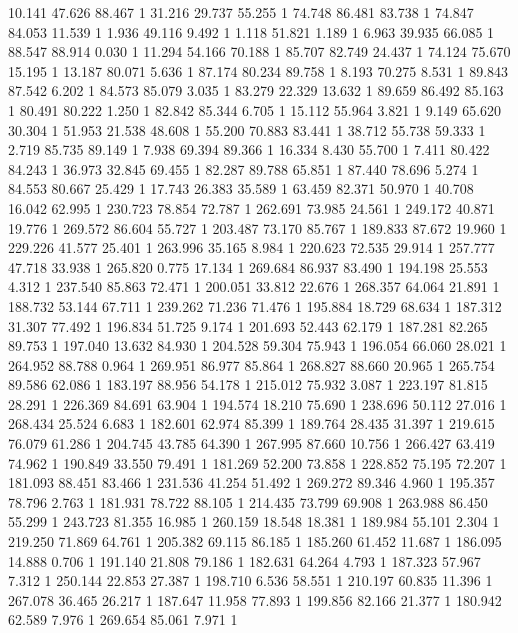 	10.141	47.626	88.467	1
	31.216	29.737	55.255	1
	74.748	86.481	83.738	1
	74.847	84.053	11.539	1
	1.936	49.116	9.492	1
	1.118	51.821	1.189	1
	6.963	39.935	66.085	1
	88.547	88.914	0.030	1
	11.294	54.166	70.188	1
	85.707	82.749	24.437	1
	74.124	75.670	15.195	1
	13.187	80.071	5.636	1
	87.174	80.234	89.758	1
	8.193	70.275	8.531	1
	89.843	87.542	6.202	1
	84.573	85.079	3.035	1
	83.279	22.329	13.632	1
	89.659	86.492	85.163	1
	80.491	80.222	1.250	1
	82.842	85.344	6.705	1
	15.112	55.964	3.821	1
	9.149	65.620	30.304	1
	51.953	21.538	48.608	1
	55.200	70.883	83.441	1
	38.712	55.738	59.333	1
	2.719	85.735	89.149	1
	7.938	69.394	89.366	1
	16.334	8.430	55.700	1
	7.411	80.422	84.243	1
	36.973	32.845	69.455	1
	82.287	89.788	65.851	1
	87.440	78.696	5.274	1
	84.553	80.667	25.429	1
	17.743	26.383	35.589	1
	63.459	82.371	50.970	1
	40.708	16.042	62.995	1
	230.723	78.854	72.787	1
	262.691	73.985	24.561	1
	249.172	40.871	19.776	1
	269.572	86.604	55.727	1
	203.487	73.170	85.767	1
	189.833	87.672	19.960	1
	229.226	41.577	25.401	1
	263.996	35.165	8.984	1
	220.623	72.535	29.914	1
	257.777	47.718	33.938	1
	265.820	0.775	17.134	1
	269.684	86.937	83.490	1
	194.198	25.553	4.312	1
	237.540	85.863	72.471	1
	200.051	33.812	22.676	1
	268.357	64.064	21.891	1
	188.732	53.144	67.711	1
	239.262	71.236	71.476	1
	195.884	18.729	68.634	1
	187.312	31.307	77.492	1
	196.834	51.725	9.174	1
	201.693	52.443	62.179	1
	187.281	82.265	89.753	1
	197.040	13.632	84.930	1
	204.528	59.304	75.943	1
	196.054	66.060	28.021	1
	264.952	88.788	0.964	1
	269.951	86.977	85.864	1
	268.827	88.660	20.965	1
	265.754	89.586	62.086	1
	183.197	88.956	54.178	1
	215.012	75.932	3.087	1
	223.197	81.815	28.291	1
	226.369	84.691	63.904	1
	194.574	18.210	75.690	1
	238.696	50.112	27.016	1
	268.434	25.524	6.683	1
	182.601	62.974	85.399	1
	189.764	28.435	31.397	1
	219.615	76.079	61.286	1
	204.745	43.785	64.390	1
	267.995	87.660	10.756	1
	266.427	63.419	74.962	1
	190.849	33.550	79.491	1
	181.269	52.200	73.858	1
	228.852	75.195	72.207	1
	181.093	88.451	83.466	1
	231.536	41.254	51.492	1
	269.272	89.346	4.960	1
	195.357	78.796	2.763	1
	181.931	78.722	88.105	1
	214.435	73.799	69.908	1
	263.988	86.450	55.299	1
	243.723	81.355	16.985	1
	260.159	18.548	18.381	1
	189.984	55.101	2.304	1
	219.250	71.869	64.761	1
	205.382	69.115	86.185	1
	185.260	61.452	11.687	1
	186.095	14.888	0.706	1
	191.140	21.808	79.186	1
	182.631	64.264	4.793	1
	187.323	57.967	7.312	1
	250.144	22.853	27.387	1
	198.710	6.536	58.551	1
	210.197	60.835	11.396	1
	267.078	36.465	26.217	1
	187.647	11.958	77.893	1
	199.856	82.166	21.377	1
	180.942	62.589	7.976	1
	269.654	85.061	7.971	1
